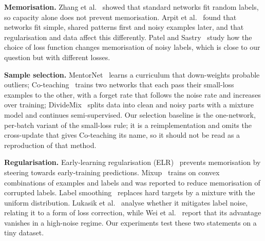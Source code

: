 \textbf{Memorisation.} Zhang et al.~\cite{zhang2016understanding} showed that standard networks fit random labels, so capacity alone does not prevent memorisation. Arpit et al.~\cite{arpit2017closer} found that networks fit simple, shared patterns first and noisy examples later, and that regularisation and data affect this differently. Patel and Sastry~\cite{patel2021memorization} study how the choice of loss function changes memorisation of noisy labels, which is close to our question but with different losses.

\textbf{Sample selection.} MentorNet~\cite{jiang2017mentornet} learns a curriculum that down-weights probable outliers; Co-teaching~\cite{han2018co} trains two networks that each pass their small-loss examples to the other, with a forget rate that follows the noise rate and increases over training; DivideMix~\cite{li2020dividemix} splits data into clean and noisy parts with a mixture model and continues semi-supervised. Our selection baseline is the one-network, per-batch variant of the small-loss rule; it is a reimplementation and omits the cross-update that gives Co-teaching its name, so it should not be read as a reproduction of that method.

\textbf{Regularisation.} Early-learning regularisation (ELR)~\cite{liu2020early} prevents memorisation by steering towards early-training predictions. Mixup~\cite{zhang2017mixup} trains on convex combinations of examples and labels and was reported to reduce memorisation of corrupted labels. Label smoothing~\cite{mller2019when} replaces hard targets by a mixture with the uniform distribution. Lukasik et al.~\cite{lukasik2020does} analyse whether it mitigates label noise, relating it to a form of loss correction, while Wei et al.~\cite{wei2021smooth} report that its advantage vanishes in a high-noise regime. Our experiments test these two statements on a tiny dataset.

